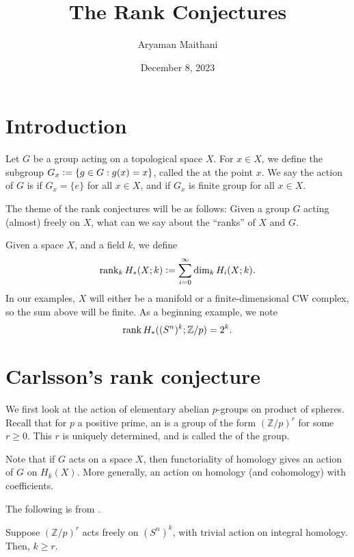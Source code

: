 \documentclass[12pt]{article}
\title{The Rank Conjectures}
\author{Aryaman Maithani}
\date{December 8, 2023}
\begin{document}
\maketitle

\section{Introduction}

Let $G$ be a group acting on a topological space $X$. For $x \in X$, we define the subgroup $G_{x} \vcentcolon= \{g \in G : g(x) = x\}$, called the  at the point $x$. We say the action of $G$ is  if $G_{x} = \{e\}$ for all $x \in X$, and  if $G_{x}$ is finite group for all $x \in X$.

The theme of the rank conjectures will be as follows: Given a group $G$ acting (almost) freely on $X$, what can we say about the ``ranks'' of $X$ and $G$. 

Given a space $X$, and a field $k$, we define
\begin{equation*} 
	\operatorname{rank}_{k} H_{\ast}(X; k) \vcentcolon= \sum_{i = 0}^{\infty} \dim_{k} H_{i}(X; k).
\end{equation*}
In our examples, $X$ will either be a manifold or a finite-dimensional CW complex, so the sum above will be finite. As a beginning example, we note
\begin{equation*} 
	\operatorname{rank} H_{\ast}((S^{n})^{k}; \mathbb{Z}/p) = 2^{k}.
\end{equation*}

\section{Carlsson's rank conjecture}

We first look at the action of elementary abelian $p$-groups on product of spheres. Recall that for $p$ a positive prime, an  is a group of the form $(\mathbb{Z}/p)^{r}$ for some $r \ge 0$. This $r$ is uniquely determined, and is called the  of the group.

Note that if $G$ acts on a space $X$, then functoriality of homology gives an action of $G$ on $H_{k}(X)$. More generally, an action on homology (and cohomology) with coefficients.

The following is from \cite{CarlssonAbelianGroupsFreely}.
\begin{thm}
	Suppose $(\mathbb{Z}/p)^{r}$ acts freely on $(S^{n})^{k}$, with trivial action on integral homology. Then, $k \ge r$.
\end{thm}
\end{document}

